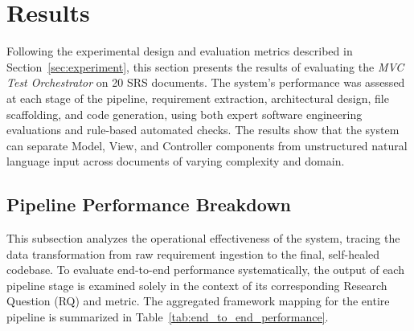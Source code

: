 \section{Results}
\label{sec:results}

Following the experimental design and evaluation metrics described in Section~\ref{sec:experiment}, this section presents the results of evaluating the \textit{MVC Test Orchestrator} on 20 SRS documents. The system's performance was assessed at each stage of the pipeline, requirement extraction, architectural design, file scaffolding, and code generation, using both expert software engineering evaluations and rule-based automated checks. The results show that the system can separate Model, View, and Controller components from unstructured natural language input across documents of varying complexity and domain.

\subsection{Pipeline Performance Breakdown}

This subsection analyzes the operational effectiveness of the system, tracing the data transformation from raw requirement ingestion to the final, self-healed codebase. To evaluate end-to-end performance systematically, the output of each pipeline stage is examined solely in the context of its corresponding Research Question (RQ) and metric. The aggregated framework mapping for the entire pipeline is summarized in Table~\ref{tab:end_to_end_performance}.

